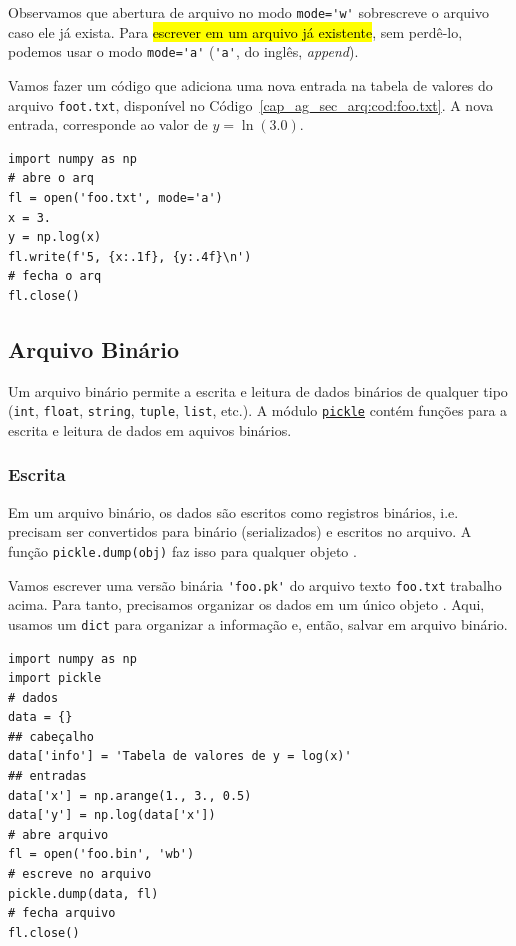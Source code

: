 Observamos que abertura de arquivo no modo \lstinline+mode='w'+ sobrescreve o arquivo caso ele já exista. Para \hl{escrever em um arquivo já existente}, sem perdê-lo, podemos usar o modo \lstinline+mode='a'+ (\lstinline+'a'+, do inglês, \textit{append}).

\begin{ex}
  Vamos fazer um código que adiciona uma nova entrada na tabela de valores do arquivo \lstinline+foot.txt+, disponível no Código~\ref{cap_ag_sec_arq:cod:foo.txt}. A nova entrada, corresponde ao valor de $y = \ln(3.0)$.

\begin{lstlisting}
import numpy as np
# abre o arq
fl = open('foo.txt', mode='a')
x = 3.
y = np.log(x)
fl.write(f'5, {x:.1f}, {y:.4f}\n')
# fecha o arq
fl.close()
\end{lstlisting}

\end{ex}

\subsection{Arquivo Binário}\label{cap_ag_sec_arq:ssec:arqbin}

Um arquivo binário permite a escrita e leitura de dados binários de qualquer tipo (\lstinline+int+, \lstinline+float+, \lstinline+string+, \lstinline+tuple+, \lstinline+list+, etc.). A módulo \href{https://docs.python.org/3/library/pickle.html}{\lstinline+pickle+} contém funções para a escrita e leitura de dados em aquivos binários.

\subsubsection{Escrita}

Em um arquivo binário, os dados são escritos como registros binários, i.e. precisam ser convertidos para binário (serializados) e escritos no arquivo. A função \lstinline+pickle.dump(obj)+ faz isso para qualquer objeto {\python}.

\begin{ex}
  Vamos escrever uma versão binária \lstinline+'foo.pk'+ do arquivo texto \lstinline+foo.txt+ trabalho acima. Para tanto, precisamos organizar os dados em um único objeto {\python}. Aqui, usamos um \lstinline+dict+ para organizar a informação e, então, salvar em arquivo binário.

\begin{lstlisting}[caption=foo.bin, label=cap_ag_sec_arq:cod:foo.bin]
import numpy as np
import pickle
# dados
data = {}
## cabeçalho
data['info'] = 'Tabela de valores de y = log(x)'
## entradas
data['x'] = np.arange(1., 3., 0.5)
data['y'] = np.log(data['x'])
# abre arquivo
fl = open('foo.bin', 'wb')
# escreve no arquivo
pickle.dump(data, fl)
# fecha arquivo
fl.close()
\end{lstlisting}

\end{ex}

